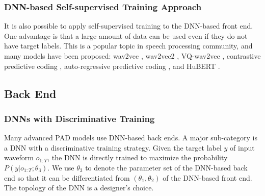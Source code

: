 \subsubsection{DNN-based Self-supervised Training Approach}

It is also possible to apply self-supervised training to the DNN-based front end. One advantage is that a large amount of data can be used even if they do not have target labels. This is a popular topic in speech processing community, and many models have been proposed: wav2vec \cite{schneider2019wav2vec}, wav2vec2 \cite{baevski2020wav2vec}, VQ-wav2vec \cite{baevski2019vq},
contrastive predictive coding \cite{chung2021similarity}, auto-regressive predictive coding \cite{chung2021similarity}, and
HuBERT \cite{hsu2021hubert, wang2022practical}. 


\subsection{Back End}

\subsubsection{DNNs with Discriminative Training}

Many advanced PAD models use DNN-based back ends. A major sub-category is a \acs{DNN} with a discriminative training strategy. Given the target label \(y\) of input waveform  \(o_{1:T}\), the \acs{DNN} is directly trained to maximize the probability \(P(y|o_{1:T};\theta_{3})\). We use \(\theta_3\) to denote the parameter set of the DNN-based back end so that it can be differentiated from \((\theta_{1},\theta_{2})\) of the DNN-based front end. The topology of the DNN is a designer’s choice\cite{wang2022practical}.

